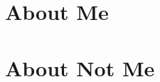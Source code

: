 \documentclass{article}
\begin{document}
\pagestyle{fancy}
\fancyhead{} %
\fancyfoot{} %
\fancyfoot[R]{\thepage} %

\section{About Me}

\newpage
\section{About Not Me}
\end{document}
